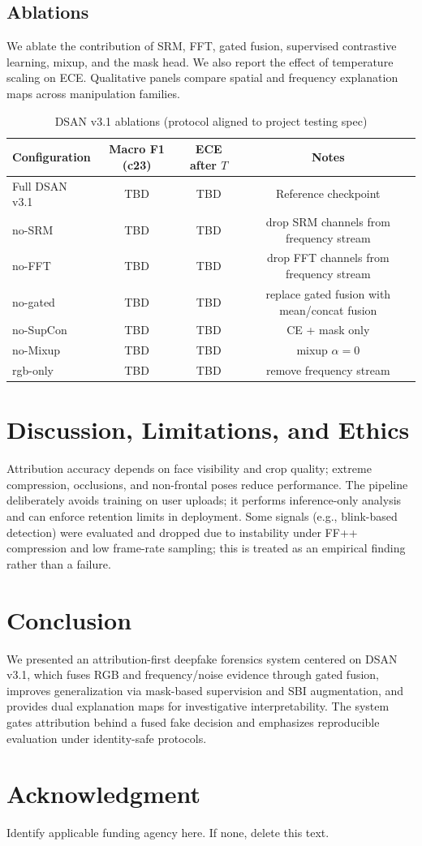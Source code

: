 \documentclass[conference]{IEEEtran}
\begin{document}
\subsection{Ablations}
We ablate the contribution of SRM, FFT, gated fusion, supervised contrastive learning, mixup, and the mask head. We also report the effect of temperature scaling on ECE. Qualitative panels compare spatial and frequency explanation maps across manipulation families.

\begin{table}[t]
\caption{DSAN v3.1 ablations (protocol aligned to project testing spec)}
\label{tab:ablations}
\centering
\begin{tabular}{@{}lccc@{}}
\toprule
Configuration & Macro F1 (c23) & ECE after $T$ & Notes \\ \midrule
Full DSAN v3.1 & TBD & TBD & Reference checkpoint \\
no-SRM & TBD & TBD & drop SRM channels from frequency stream \\
no-FFT & TBD & TBD & drop FFT channels from frequency stream \\
no-gated & TBD & TBD & replace gated fusion with mean/concat fusion \\
no-SupCon & TBD & TBD & CE + mask only \\
no-Mixup & TBD & TBD & mixup $\alpha=0$ \\
rgb-only & TBD & TBD & remove frequency stream \\
\bottomrule
\end{tabular}
\end{table}

\section{Discussion, Limitations, and Ethics}
Attribution accuracy depends on face visibility and crop quality; extreme compression, occlusions, and non-frontal poses reduce performance. The pipeline deliberately avoids training on user uploads; it performs inference-only analysis and can enforce retention limits in deployment. Some signals (e.g., blink-based detection) were evaluated and dropped due to instability under FF++ compression and low frame-rate sampling; this is treated as an empirical finding rather than a failure.

\section{Conclusion}
We presented an attribution-first deepfake forensics system centered on DSAN v3.1, which fuses RGB and frequency/noise evidence through gated fusion, improves generalization via mask-based supervision and SBI augmentation, and provides dual explanation maps for investigative interpretability. The system gates attribution behind a fused fake decision and emphasizes reproducible evaluation under identity-safe protocols.

\section*{Acknowledgment}
Identify applicable funding agency here. If none, delete this text.



\end{document}
